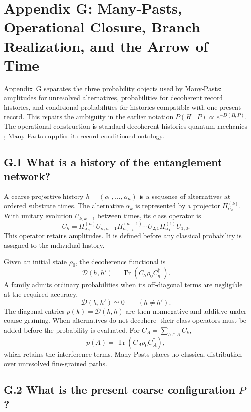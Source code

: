 \documentclass[11pt]{article}
\begin{document}
\section*{Appendix G: Many-Pasts, Operational Closure, Branch Realization, and the Arrow of Time}

Appendix~G separates the three probability objects used by Many-Pasts: amplitudes for unresolved alternatives, probabilities for decoherent record histories, and conditional probabilities for histories compatible with one present record. This repairs the ambiguity in the earlier notation $P(H\mid P)\propto e^{-D(H,P)}$. The operational construction is standard decoherent-histories quantum mechanics \citep{Halliwell1994}; Many-Pasts supplies its record-conditioned ontology.

\subsection*{G.1 What is a history of the entanglement network?}

A coarse projective history $h=(\alpha_1,\ldots,\alpha_n)$ is a sequence of alternatives at ordered substrate times. The alternative $\alpha_k$ is represented by a projector $\Pi^{(k)}_{\alpha_k}$. With unitary evolution $U_{k,k-1}$ between times, its class operator is
\[
C_h=\Pi^{(n)}_{\alpha_n}U_{n,n-1}\Pi^{(n-1)}_{\alpha_{n-1}}\cdots
U_{2,1}\Pi^{(1)}_{\alpha_1}U_{1,0}.
\]
This operator retains amplitudes. It is defined before any classical probability is assigned to the individual history.

Given an initial state $\rho_0$, the decoherence functional is
\[
\mathcal D(h,h')=\operatorname{Tr}\!\left(C_h\rho_0C_{h'}^\dagger\right).
\]
A family admits ordinary probabilities when its off-diagonal terms are negligible at the required accuracy,
\[
\mathcal D(h,h')\simeq0\qquad(h\ne h').
\]
The diagonal entries $p(h)=\mathcal D(h,h)$ are then nonnegative and additive under coarse-graining. When alternatives do not decohere, their class operators must be added before the probability is evaluated. For $C_A=\sum_{h\in A}C_h$,
\[
p(A)=\operatorname{Tr}\!\left(C_A\rho_0C_A^\dagger\right),
\]
which retains the interference terms. Many-Pasts places no classical distribution over unresolved fine-grained paths.

\subsection*{G.2 What is the present coarse configuration $P$?}
\end{document}
